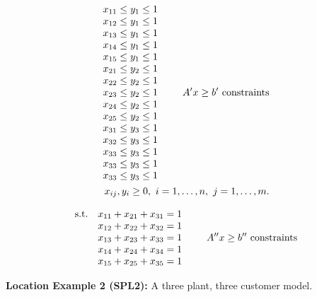 \begin{eqnarray*}
\begin{array}{lll}
x_{11}\leq y_{1}\leq 1 & &  \\
x_{12}\leq y_{1}\leq 1 & & \\
x_{13}\leq y_{1}\leq 1 & & \\
x_{14}\leq y_{1}\leq 1 & & \\
x_{15}\leq y_{1}\leq 1 & & \\
x_{21}\leq y_{2}\leq 1 & & \\
x_{22}\leq y_{2}\leq 1 & &   \\
x_{23}\leq y_{2}\leq 1 & & \\
x_{24}\leq y_{2}\leq 1 & & \\
x_{25}\leq y_{2}\leq 1 & & \\
x_{31}\leq y_{3}\leq 1 & & \\
x_{32}\leq y_{3}\leq 1 & &\\
x_{33}\leq y_{3}\leq 1 & &\\ 
x_{33}\leq y_{3}\leq 1 & &\\ 
x_{33}\leq y_{3}\leq 1 & &\\ 
\end{array}
 A^{\prime }x \ge b^{\prime} \,\, {\rm constraints} \\
x_{ij},y_{i}\ge 0 , \,\, i = 1, \ldots, n, \, \, j = 1, \ldots, m.   
\end{eqnarray*}

 
\[
\begin{array}{llll}
{\rm s.t.} &x_{11}+x_{21}+x_{31}  = 1 & & \\
&x_{12}+x_{22}+x_{32} = 1 & &   \\
&x_{13}+x_{23}+x_{33} = 1 & &  \\
&x_{14}+x_{24}+x_{34} = 1 & &  \\
&x_{15}+x_{25}+x_{35} = 1 & &  
\end{array}   A^{\prime \prime}   x \ge b^{\prime \prime} \,\, {\rm
constraints}
\]
  
  


                      


\vskip 12pt

{\bf Location Example 2 (SPL2):} A three plant, three customer model.

\vskip 8pt


